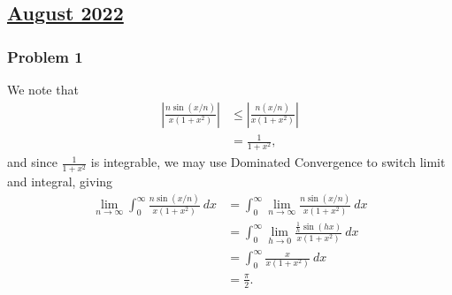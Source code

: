 \documentclass[10pt]{mypackage}
\begin{document}
\subsection{\href{https://math.virginia.edu/graduate/exams/analysis/2022Aug_real.pdf}{August 2022}}%
\subsubsection{Problem 1}%
We note that
\begin{align*}
  \left\vert \frac{n\sin\left( x/n \right)}{x\left( 1+x^2 \right)}  \right\vert &\leq \left\vert \frac{n\left( x/n \right)}{x\left( 1+x^2 \right)} \right\vert\\
                                                                                &= \frac{1}{1+x^2},
\end{align*}
and since $\frac{1}{1+x^2}$ is integrable, we may use Dominated Convergence to switch limit and integral, giving
\begin{align*}
  \lim_{n\rightarrow\infty} \int_{0}^{\infty} \frac{n\sin\left( x/n \right)}{x\left( 1+x^2 \right)}\:dx &= \int_{0}^{\infty} \lim_{n\rightarrow\infty}\frac{n\sin\left( x/n \right)}{x\left( 1+x^2 \right)}\:dx\\
                                                                                                        &= \int_{0}^{\infty} \lim_{h\rightarrow 0} \frac{\frac{1}{h}\sin\left( hx \right)}{x\left( 1+x^2 \right)}\:dx\\
                                                                                                        &= \int_{0}^{\infty} \frac{x}{x\left( 1+x^2 \right)}\:dx\\
                                                                                                        &= \frac{\pi}{2}.
\end{align*}
\end{document}
